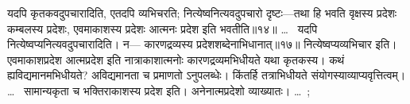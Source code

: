 {{यदपि कृतकवदुपचारादिति, एतदपि व्यभिचरति; नित्येष्वनित्यवदुपचारो दृष्टः---तथा हि भवति वृक्षस्य प्रदेशः कम्बलस्य प्रदेशः, एवमाकाशस्य प्रदेशः आत्मनः प्रदेश इति भवतीति॥१४॥
\ldots\ 
%
%
%
%
%
%
%
%
%
%
%
%
%
%
%
%
%
%
%
%
यदपि नित्येष्वप्यनित्यवदुपचारादिति। न---%
%
{\dnb कारणद्रव्यस्य प्रदेशशब्देनाभिधानात्॥१७॥}
%
नित्येष्वप्यव्यभिचार इति। एवमाकाशप्रदेश आत्मप्रदेश इति नात्राकाशात्मनोः कारणद्रव्यमभिधीयते यथा कृतकस्य। कथं ह्यविद्यमानमभिधीयते? \barfu अविद्यमानता च \barfu प्रमाणतो \barfu ऽनुपलब्धेः। किंतर्हि तत्राभिधीयते संयोगस्याव्याप्यवृत्तित्वम्। \ldots\ %
\barfu सामान्यकृता च भक्तिराकाशस्य प्रदेश इति। \barfu अनेनात्मप्रदेशो \barfu व्याख्यातः।} \ldots\ \citep[594–613]{ns}; \SplitNote%
}

